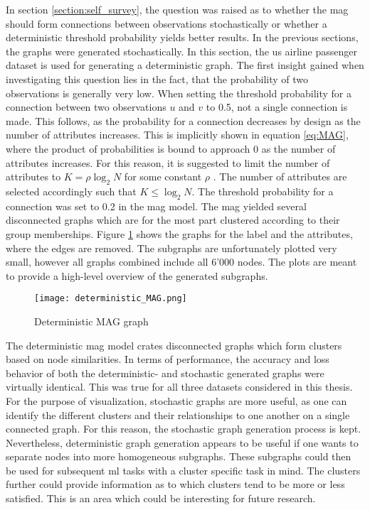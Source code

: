   In section \ref{section:self_survey}, the question was raised 
  as to whether the \acs{mag} should form connections between observations
  stochastically or whether a deterministic threshold probability yields better 
  results. In the previous sections, the graphs were generated stochastically.
  In this section, the \acs{us} airline passenger dataset is used for 
  generating a deterministic graph. The first insight gained when investigating 
  this question lies in the fact, that the probability of two observations is 
  generally very low. When setting the threshold probability for a connection 
  between two observations $u$ and $v$ to 0.5, not a single connection is made. 
  This follows, as the probability for a connection decreases by design as the 
  number of attributes increases. This is implicitly shown in equation 
  \ref{eq:MAG}, where the product of probabilities is bound to approach 0 as
  the number of attributes increases. For this reason, it is suggested to limit 
  the number of attributes to $K=\rho\log_{2}N$ for some constant $\rho$ 
  \citep[p. 122]{kim2012multiplicative}. The number of attributes are selected 
  accordingly such that $K\leqslant\log_{2} N$. The threshold probability for a 
  connection was set to 0.2 in the \acs{mag} model. The \acs{mag} yielded 
  several disconnected graphs which are for the most part clustered according to 
  their group memberships. Figure \ref{fig:det_MAG} shows the graphs for the 
  label and the attributes, where the edges are removed. The subgraphs are 
  unfortunately plotted very small, however all graphs combined include all 
  6'000 nodes. The plots are meant to provide a high-level overview of the 
  generated subgraphs. 

  \begin{figure}[h]
		\centering
		\texttt{[image: deterministic\_MAG.png]}
		\caption{Deterministic MAG graph}
        \label{fig:det_MAG}
  \end{figure}

  \noindent The deterministic \acs{mag} model crates disconnected graphs which 
  form clusters based on node similarities. In terms of performance, the accuracy 
  and loss behavior of both the deterministic- and stochastic generated graphs 
  were virtually identical. This was true for all three datasets considered in 
  this thesis. For the purpose of visualization, stochastic graphs are more 
  useful, as one can identify the different clusters and their relationships to 
  one another on a single connected graph. For this reason, the stochastic graph 
  generation process is kept. Nevertheless, deterministic graph generation 
  appears to be useful if one wants to separate nodes into more homogeneous 
  subgraphs. These subgraphs could then be used for subsequent \acs{ml} 
  tasks with a cluster specific task in mind. The clusters further could 
  provide information as to which clusters tend to be more or less satisfied. 
  This is an area which could be interesting for future research.
  
